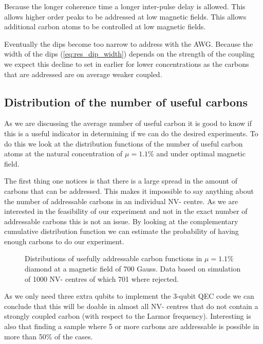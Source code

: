 Because the longer coherence time a longer inter-pulse delay is allowed. This allows higher order peaks to be addressed at low magnetic fields. This allows additional carbon atoms to be controlled at low magnetic fields. 

Eventually the dips become too narrow to address with the AWG. Because the width of the dips (\autoref{eq:res_dip_width}) depends on the strength of the coupling we expect this decline to set in earlier for lower concentrations as the carbons that are addressed are on average weaker coupled. 

\subsection{Distribution of the number of useful carbons}
\label{distributionofthenumberofusefulcarbons}

As we are discussing the average number of useful carbon it is good to know if this is a useful indicator in determining if we can do the desired experiments. To do this we look at the distribution functions of the number of useful carbon atoms at the natural concentration of $\mu = 1.1\% $ and under optimal magnetic field. 

The first thing one notices is that there is a large spread in the amount of carbons that can be addressed. This makes it impossible to say anything about the number of addressable carbons in an individual NV- centre. As we are interested in the feasibility of our experiment and not in the exact number of addressable carbons this is not an issue. By looking at the complementary cumulative distribution function we can estimate the probability of having enough carbons to do our experiment. 


\begin{figure}
        \centering
 \caption{Distributions of usefully addressable carbon functions in $\mu = 1.1\%$ diamond at a magnetic field of 700 Gauss. Data based on simulation of 1000 NV- centres of which 701 where rejected. }\label{fig:sim_dist}
\end{figure}


As we only need three extra qubits to implement the 3-qubit QEC code we can conclude that this will be doable in almost all NV- centres that do not contain a strongly coupled carbon (with respect to the Larmor frequency). Interesting is also that finding a sample where 5 or more carbons are addressable is possible in more than 50\% of the cases. 


